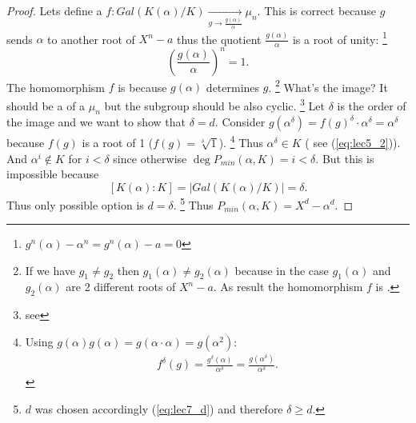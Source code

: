 \begin{proposition}
\begin{proof}
    Lets define a 
    $f: Gal\left(K\left(\alpha\right)/K\right) \xrightarrow[g \to
      \frac{g\left(\alpha\right)}{\alpha}]{} \mu_n$. This is correct
    because $g$ sends $\alpha$ to another root of $X^n - a$ thus the
    quotient $\frac{g\left(\alpha\right)}{\alpha}$ is a root of unity:
    \footnote{
      $g^n\left(\alpha\right) - \alpha^n =
      g^n\left(\alpha\right) - a = 0$
    }
    \[
    \left(\frac{g\left(\alpha\right)}{\alpha}\right)^n = 1.
    \]
    The homomorphism $f$ is  because
    $g\left(\alpha\right)$ determines $g$.
    \footnote{
      If we have $g_1 \ne g_2$ then
      $g_1\left(\alpha\right) \ne g_2\left(\alpha\right)$ because
      in the case $g_1\left(\alpha\right)$ and
      $g_2\left(\alpha\right)$ are 2 different roots of $X^n - a$.
      As result the homomorphism $f$ is .
    }
    What's the image? It should
    be a  of a  $\mu_n$
    but the subgroup should be also cyclic. 
    \footnote{
      see 
    }
    Let $\delta$ is the order of the image and we want to show that
    $\delta = d$. Consider
    $g\left(\alpha^\delta\right) = f\left(g\right)^\delta \cdot
    \alpha^\delta = \alpha^\delta$ because $f\left(g\right)$ is a root
    of 1 ($f\left(g\right) = \sqrt[\delta]{1}$).
    \footnote{
      Using $g\left(\alpha\right)g\left(\alpha\right) = g\left(\alpha
      \cdot \alpha \right) = g\left(\alpha^2\right)$:
      \begin{eqnarray}
        f^\delta\left(g\right) =
        \frac{g^\delta\left(\alpha\right)}{\alpha^\delta} =
        \frac{g\left(\alpha^\delta\right)}{\alpha^\delta}.
        \nonumber
      \end{eqnarray}      
    }
    Thus $\alpha^\delta
    \in K$ ( see (\ref{eq:lec5_2})). And $\alpha^i \notin K$ for $i < \delta$ since otherwise
    $\deg P_{min}\left(\alpha, K\right) = i < \delta$. But this is
    impossible because
    \[
    \left[K\left(\alpha\right):K\right] =
    \left|Gal\left(K\left(\alpha\right)/K\right)\right| = \delta.
    \]
    Thus only possible option is $d = \delta$.
    \footnote{
      $d$ was chosen accordingly (\ref{eq:lec7_d}) and therefore
      $\delta \ge d$.
    }
    Thus
    $P_{min}\left(\alpha, K\right) = X^d - \alpha^d$.
  \end{proof}
  \label{prop:lec7_1}
\end{proposition}

